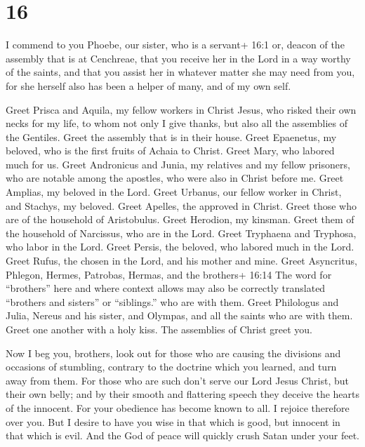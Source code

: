 \hypertarget{section-15}{%
\section{16}\label{section-15}}

 I commend to you Phoebe, our sister, who is a servant+ 16:1
or, deacon of the assembly that is at Cenchreae,  that you
receive her in the Lord in a way worthy of the saints, and that you
assist her in whatever matter she may need from you, for she herself
also has been a helper of many, and of my own self.

 Greet Prisca and Aquila, my fellow workers in Christ Jesus,
 who risked their own necks for my life, to whom not only I
give thanks, but also all the assemblies of the Gentiles. 
Greet the assembly that is in their house. Greet Epaenetus, my beloved,
who is the first fruits of Achaia to Christ.  Greet Mary,
who labored much for us.  Greet Andronicus and Junia, my
relatives and my fellow prisoners, who are notable among the apostles,
who were also in Christ before me.  Greet Amplias, my
beloved in the Lord.  Greet Urbanus, our fellow worker in
Christ, and Stachys, my beloved.  Greet Apelles, the
approved in Christ. Greet those who are of the household of Aristobulus.
 Greet Herodion, my kinsman. Greet them of the household of
Narcissus, who are in the Lord.  Greet Tryphaena and
Tryphosa, who labor in the Lord. Greet Persis, the beloved, who labored
much in the Lord.  Greet Rufus, the chosen in the Lord, and
his mother and mine.  Greet Asyncritus, Phlegon, Hermes,
Patrobas, Hermas, and the brothers+ 16:14 The word for ``brothers'' here
and where context allows may also be correctly translated ``brothers and
sisters'' or ``siblings.'' who are with them.  Greet
Philologus and Julia, Nereus and his sister, and Olympas, and all the
saints who are with them.  Greet one another with a holy
kiss. The assemblies of Christ greet you.

 Now I beg you, brothers, look out for those who are
causing the divisions and occasions of stumbling, contrary to the
doctrine which you learned, and turn away from them.  For
those who are such don't serve our Lord Jesus Christ, but their own
belly; and by their smooth and flattering speech they deceive the hearts
of the innocent.  For your obedience has become known to
all. I rejoice therefore over you. But I desire to have you wise in that
which is good, but innocent in that which is evil.  And the
God of peace will quickly crush Satan under your feet.

